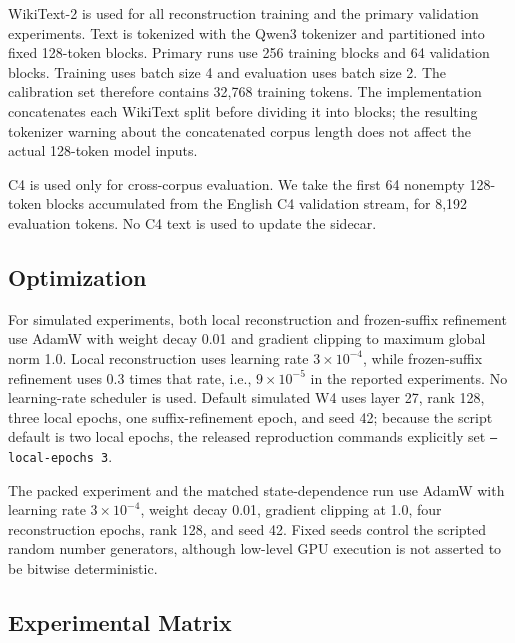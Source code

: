 \documentclass[11pt]{article}
\begin{document}
WikiText-2 \cite{merity2016pointer} is used for all reconstruction training and the primary validation experiments. Text is tokenized with the Qwen3 tokenizer and partitioned into fixed 128-token blocks. Primary runs use 256 training blocks and 64 validation blocks. Training uses batch size 4 and evaluation uses batch size 2. The calibration set therefore contains 32,768 training tokens. The implementation concatenates each WikiText split before dividing it into blocks; the resulting tokenizer warning about the concatenated corpus length does not affect the actual 128-token model inputs.

C4 is used only for cross-corpus evaluation. We take the first 64 nonempty 128-token blocks accumulated from the English C4 validation stream, for 8,192 evaluation tokens. No C4 text is used to update the sidecar.

\subsection{Optimization}

For simulated experiments, both local reconstruction and frozen-suffix refinement use AdamW with weight decay 0.01 and gradient clipping to maximum global norm 1.0. Local reconstruction uses learning rate $3\times10^{-4}$, while frozen-suffix refinement uses $0.3$ times that rate, i.e., $9\times10^{-5}$ in the reported experiments. No learning-rate scheduler is used. Default simulated W4 uses layer 27, rank 128, three local epochs, one suffix-refinement epoch, and seed 42; because the script default is two local epochs, the released reproduction commands explicitly set \texttt{--local-epochs 3}.

The packed experiment and the matched state-dependence run use AdamW with learning rate $3\times10^{-4}$, weight decay 0.01, gradient clipping at 1.0, four reconstruction epochs, rank 128, and seed 42. Fixed seeds control the scripted random number generators, although low-level GPU execution is not asserted to be bitwise deterministic.

\subsection{Experimental Matrix}
\end{document}
